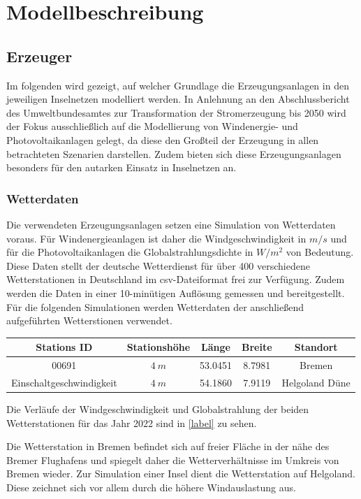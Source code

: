\chapter{Modellbeschreibung}\label{Modellbeschreibung}
\section{Erzeuger}

Im folgenden wird gezeigt, auf welcher Grundlage die Erzeugungsanlagen in den jeweiligen Inselnetzen modelliert werden. In Anlehnung an den Abschlussbericht des Umweltbundesamtes zur Transformation der Stromerzeugung bis 2050 wird der Fokus ausschließlich auf die Modellierung von Windenergie- und Photovoltaikanlagen gelegt, da diese den Großteil der Erzeugung in allen betrachteten Szenarien darstellen. Zudem bieten sich diese Erzeugungsanlagen besonders für den autarken Einsatz in Inselnetzen an.

\subsection{Wetterdaten}
Die verwendeten Erzeugungsanlagen setzen eine Simulation von Wetterdaten voraus. Für Windenergieanlagen ist daher die Windgeschwindigkeit in $m/s$  und für die Photovoltaikanlagen die Globalstrahlungsdichte in $W/m^2$ von Bedeutung. Diese Daten stellt der deutsche Wetterdienst für über 400 verschiedene Wetterstationen in Deutschland im csv-Dateiformat frei zur Verfügung. Zudem werden die Daten in einer 10-minütigen Auflösung gemessen und bereitgestellt. Für die folgenden Simulationen werden Wetterdaten der anschließend aufgeführten Wetterstionen verwendet.

\begin{center}
	\begin{tabular}[htpb]{c|c|c|c|c}
		Stations ID & Stationshöhe & Länge & Breite & Standort \\
		\hline
		00691 & $4~m$ & 53.0451 & 8.7981 & Bremen \\
		Einschaltgeschwindigkeit & $4~m$ & 54.1860 & 7.9119 & Helgoland Düne
	\end{tabular}
\end{center}

Die Verläufe der Windgeschwindigkeit und Globalstrahlung der beiden Wetterstationen für das Jahr 2022 sind in \autoref{label} zu sehen.

Die Wetterstation in Bremen befindet sich auf freier Fläche in der nähe des Bremer Flughafens und spiegelt daher die Wetterverhältnisse im Umkreis von Bremen wieder. Zur Simulation einer Insel dient die Wetterstation auf Helgoland. Diese zeichnet sich vor allem durch die höhere Windauslastung aus.
